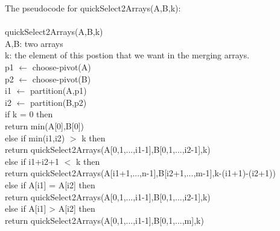 \documentclass[12pt]{article}
\begin{document}
	The pseudocode for quickSelect2Arrays(A,B,k):\\
	\\
	quickSelect2Arrays(A,B,k)\\
	A,B: two arrays\\
	k: the element of this postion that we want in the merging arrays.\\
	p1 $\gets$ choose-pivot(A)\\
	p2 $\gets$ choose-pivot(B)\\
	i1 $\gets$ partition(A,p1)\\
	i2 $\gets$ partition(B,p2)\\
	if k = 0 then\\
	\hphantom{1111} return min(A[0],B[0])\\
	else if min(i1,i2) $>$ k then\\
	\hphantom{1111} return quickSelect2Arrays(A[0,1,...,i1-1],B[0,1,...,i2-1],k)\\
	else if i1+i2+1 $<$ k then\\
	\hphantom{1111} return quickSelect2Arrays(A[i1+1,...,n-1],B[i2+1,...,m-1],k-(i1+1)-(i2+1))\\
	else if A[i1] = A[i2] then\\
	\hphantom{1111} return quickSelect2Arrays(A[0,1,...,i1-1],B[0,1,...,i2-1],k)\\
	else if A[i1] > A[i2] then\\
	\hphantom{1111} return quickSelect2Arrays(A[0,1,...,i1-1],B[0,1,...,m],k)
	
	
	
\end{document}
